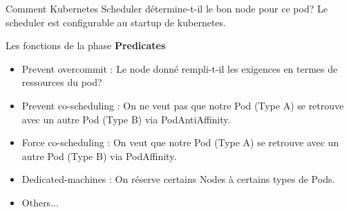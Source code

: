 \documentclass{bredelebeamer}
\begin{document}
\begin{frame}{Comment Kubernetes Scheduler détermine-t-il le bon node pour ce pod?}
Le scheduler est configurable au startup de kubernetes.
\begin{block}{Les fonctions de la phase \textbf{Predicates}}
\begin{itemize}
\item Prevent overcommit : Le node donné rempli-t-il les exigences en termes de ressources du pod?\\
\pause
\item Prevent co-scheduling : On ne veut pas que notre Pod (Type A) se retrouve avec un autre Pod (Type B) via PodAntiAffinity.\\
\pause
\item Force co-scheduling : On veut que notre Pod (Type A) se retrouve avec un autre Pod (Type B) via PodAffinity.
\pause
\item Dedicated-machines : On réserve certains Nodes à certains types de Pods.
\item Others...
\end{itemize}
\end{block}
\end{frame}
\end{document}
